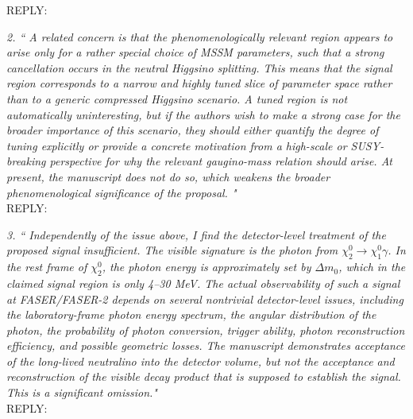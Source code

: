 \documentclass[12pt]{article}
\begin{document}
REPLY:   \\

\smallskip
\noindent

{\it 2. `` A related concern is that the phenomenologically relevant region appears to arise only for a rather special choice of MSSM parameters, such that a strong cancellation occurs in the neutral Higgsino splitting. This means that the signal region corresponds to a narrow and highly tuned slice of parameter space rather than to a generic compressed Higgsino scenario. A tuned region is not automatically uninteresting, but if the authors wish to make a strong case for the broader importance of this scenario, they should either quantify the degree of tuning explicitly or provide a concrete motivation from a high-scale or SUSY-breaking perspective for why the relevant gaugino-mass relation should arise. At present, the manuscript does not do so, which weakens the broader phenomenological significance of the proposal. " } \\

REPLY:   \\
\smallskip
\noindent

{\it 3. `` Independently of the issue above, I find the detector-level treatment of the proposed signal
insufficient. The visible signature is the photon from $\chi_2^0 \to \chi_1^0 \gamma$. In the rest frame of $\chi_2^0 $, the photon energy is approximately set by $\Delta m_0$, which in the claimed signal region is only 4–30 MeV. The actual observability of such a signal at FASER/FASER-2 depends on several nontrivial detector-level issues, including the laboratory-frame photon energy spectrum, the angular distribution of the photon, the probability of photon conversion, trigger ability, photon reconstruction efficiency, and possible geometric losses. The manuscript demonstrates acceptance of the long-lived neutralino into the detector volume, but not the acceptance and reconstruction of the visible decay product that is supposed to establish the signal. This is a significant omission." } \\

REPLY:  

\smallskip
\noindent
\end{document}
